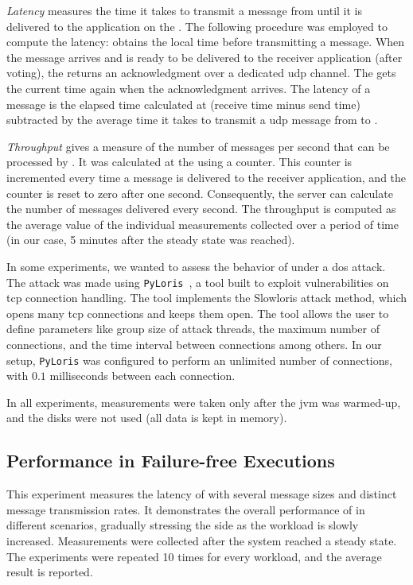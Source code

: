\emph{Latency} measures the time it takes to transmit a message from \sender until it is delivered to the application on the \postsieve. 
The following procedure was employed to compute the latency: \sender obtains the local time before transmitting a message. 
When the message arrives and is ready to be delivered to the receiver application (after voting), the \postsieve returns an acknowledgment over a dedicated \gls{udp} channel.
The \Sender gets the current time again when the acknowledgment arrives. 
The latency of a message is the elapsed time calculated at \sender (receive time minus send time) subtracted by the average time it takes to transmit a \gls{udp} message from \postsieve to \sender.

\emph{Throughput} gives a measure of the number of messages per second that can be processed by \sieveq. 
It was calculated at the \postsieve using a counter. 
This counter is incremented every time a message is delivered to the receiver application, and the counter is reset to zero after one second. 
Consequently, the server can calculate the number of messages delivered every second. 
The throughput is computed as the average value of the individual measurements collected over a period of time (in our case, 5 minutes after the steady state was reached).

In some experiments, we wanted to assess the behavior of \sieveq under a \gls{dos} attack. 
The attack was made using \texttt{PyLoris}~\cite{pyloris}, a tool built to exploit vulnerabilities on \gls{tcp} connection handling.
The tool implements the Slowloris attack method, which opens many \gls{tcp} connections and keeps them open.
The tool allows the user to define parameters like group size of attack threads, the maximum number of connections, and the time interval between connections among others.
In our setup, \texttt{PyLoris} was configured to perform an unlimited number of connections, with $0.1$ milliseconds between each connection.

In all experiments, measurements were taken only after the \gls{jvm} was warmed-up, and the disks were not used (all data is kept in memory).


\subsection{Performance in Failure-free Executions}
\label{throughput_latency}

This experiment measures the latency of \sieveq with several message sizes and distinct message transmission rates. 
It demonstrates the overall performance of \sieveq in different scenarios, gradually stressing the \postsieve side as the workload is slowly increased. 
Measurements were collected after the system reached a steady state. 
The experiments were repeated 10 times for every workload, and the average result is reported.


